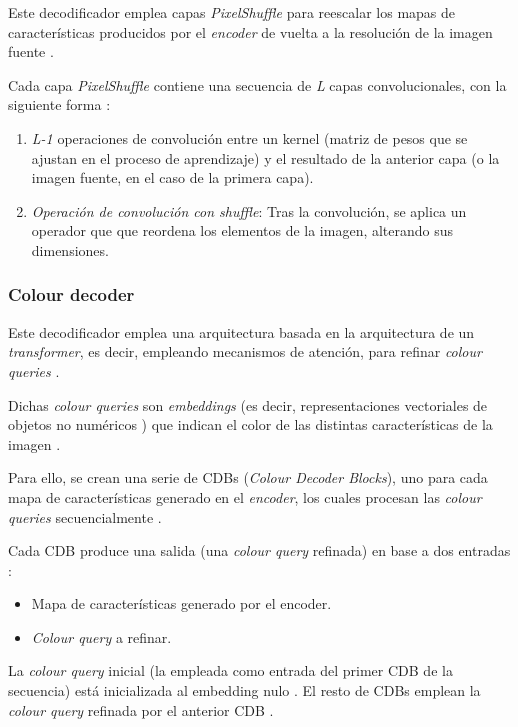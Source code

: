 \documentclass[a4paper]{article}
\begin{document}
Este decodificador emplea capas \textit{PixelShuffle} \cite{PixelShuffle} para reescalar los mapas de características producidos por el \textit{encoder} de vuelta a la resolución de la imagen fuente \cite{DDColor}.

Cada capa \textit{PixelShuffle} contiene una secuencia de \textit{L} capas convolucionales, con la siguiente forma \cite{PixelShuffle}:

\begin{enumerate}
  \item{\textit{L-1} operaciones de convolución entre un kernel (matriz de pesos que se ajustan en el proceso de aprendizaje) y el resultado de la anterior capa (o la imagen fuente, en el caso de la primera capa).}
  \item{\textit{Operación de convolución con shuffle}: Tras la convolución, se aplica un operador que que reordena los elementos de la imagen, alterando sus dimensiones.}
\end{enumerate}

\subsubsection{Colour decoder}

Este decodificador emplea una arquitectura basada en la arquitectura de un \textit{transformer}, es decir, empleando mecanismos de atención, para refinar \textit{colour queries} \cite{DDColor}.

Dichas \textit{colour queries} son \textit{embeddings} (es decir, representaciones vectoriales de objetos no numéricos \cite{IBMEmbedding}) que indican el color de las distintas características de la imagen \cite{DDColor}.

Para ello, se crean una serie de CDBs (\textit{Colour Decoder Blocks}), uno para cada mapa de características generado en el \textit{encoder}, los cuales procesan las \textit{colour queries} secuencialmente \cite{DDColor}.

Cada CDB produce una salida (una \textit{colour query} refinada) en base a dos entradas \cite{DDColor}:

\begin{itemize}
  \item{Mapa de características generado por el encoder.}
  \item{\textit{Colour query} a refinar.}
\end{itemize}

La \textit{colour query} inicial (la empleada como entrada del primer CDB de la secuencia) está inicializada al embedding nulo \cite{DDColor}. El resto de CDBs emplean la \textit{colour query} refinada por el anterior CDB \cite{DDColor}.
\end{document}
